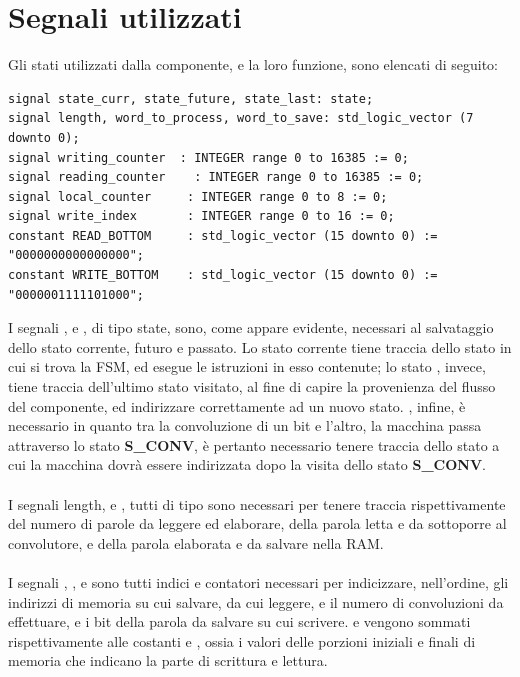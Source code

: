 \section{Segnali utilizzati}
Gli stati utilizzati dalla componente, e la loro funzione, sono elencati di seguito:
\\
\begin{lstlisting}
signal state_curr, state_future, state_last: state;
signal length, word_to_process, word_to_save: std_logic_vector (7 downto 0);
signal writing_counter  : INTEGER range 0 to 16385 := 0;
signal reading_counter    : INTEGER range 0 to 16385 := 0;
signal local_counter     : INTEGER range 0 to 8 := 0;
signal write_index       : INTEGER range 0 to 16 := 0;
constant READ_BOTTOM     : std_logic_vector (15 downto 0) := "0000000000000000";
constant WRITE_BOTTOM    : std_logic_vector (15 downto 0) := "0000001111101000";
\end{lstlisting}
I segnali ,  e , di tipo state, sono, come appare evidente, necessari al salvataggio dello stato corrente, futuro e passato. Lo stato corrente tiene traccia dello stato in cui si trova la FSM, ed esegue le istruzioni in esso contenute; lo stato , invece, tiene traccia dell’ultimo stato visitato, al fine di capire la provenienza del flusso del componente, ed indirizzare correttamente ad un nuovo stato. , infine, è necessario in quanto tra la convoluzione di un bit e l’altro, la macchina passa attraverso lo stato \textbf{S\_CONV}, è pertanto necessario tenere traccia dello stato a cui la macchina dovrà essere indirizzata dopo la visita dello stato \textbf{S\_CONV}.
\\\\
I segnali length,  e , tutti di tipo  sono necessari per tenere traccia rispettivamente del numero di parole da leggere ed elaborare, della parola letta e da sottoporre al convolutore, e della parola elaborata e da salvare nella RAM.
\\\\
I segnali , ,   e  sono tutti indici e contatori necessari per indicizzare, nell’ordine, gli indirizzi di memoria su cui salvare, da cui leggere, e il numero di convoluzioni da effettuare, e i bit della parola da salvare su cui scrivere.  e  vengono sommati rispettivamente alle costanti  e , ossia i valori delle porzioni iniziali e finali di memoria che indicano la parte di scrittura e lettura.

